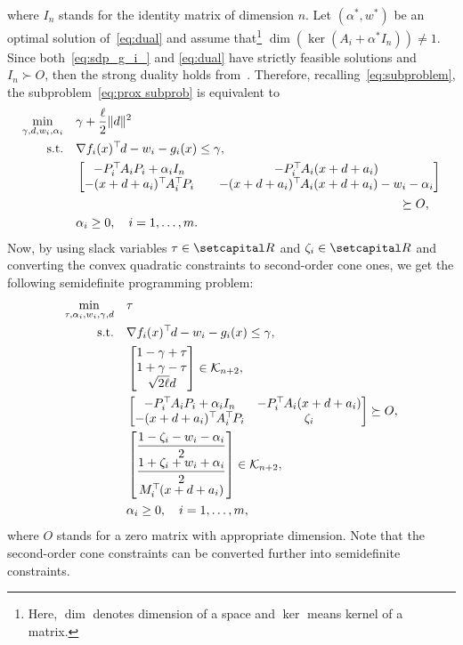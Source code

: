 \documentclass[../../main]{subfiles}
\begin{document}
where $I_n$ stands for the identity matrix of dimension $n$. Let $(\alpha^\ast, w^\ast)$ be an optimal solution of~\cref{eq:dual} and assume that\footnote{Here, $\dim$ denotes dimension of a space and $\ker$ means kernel of a matrix.} $\dim(\ker(A_i + \alpha^\ast I_n)) \neq 1$. Since both~\cref{eq:sdp_g_i_} and \cref{eq:dual} have strictly feasible solutions and $I_n \succ O$, then the strong duality holds from~\cite[Theorem~3.5]{Beck2006}. Therefore, recalling~\cref{eq:subproblem}, the subproblem~\cref{eq:prox subprob} is equivalent to
\begin{align}
\begin{aligned}
\min_{\gamma, d, w_i, \alpha_i} \quad & \gamma + \frac\ell2 \| d \|^2 \\ 
\st    \quad   & \nabla f_i (x)^\T d - w_i - g_i (x) \leq \gamma, \\
& \begin{bmatrix}
-P_i^\T A_i P_i + \alpha_i I_n &\quad -P_i^\T A_i (x + d + a_i) \\
-(x + d + a_i)^\T A_i^\T P_i &\quad -(x + d + a_i)^\T A_i (x + d + a_i) - w_i -\alpha_i
\end{bmatrix} \\
& \hspace{26em} \succeq O, \\
& \alpha_i \geq 0, \quad i = 1,\dots,m.
\end{aligned}
\end{align}
Now, by using slack variables $\tau \in \setR$ and $\zeta_i \in \setR$ and converting the convex quadratic constraints to second-order cone ones, we get the following semidefinite programming problem:
\begin{align} \label{eq:sdp}
\begin{aligned}
\min_{\tau, \alpha_i, w_i, \gamma, d} \quad   &\tau \\ 
\mathrm{s.t.}    \quad   &\nabla f_i(x)^\top\hspace{-1pt} d - w_i - g_i(x) \leq \gamma, \\
& \begin{bmatrix} 1 - \gamma + \tau \\
1 + \gamma - \tau \\
\sqrt{2 \ell} d
\end{bmatrix} \in \mathcal{K}_{n + 2}, \\
& 
\begin{bmatrix}
-P_i^\top\hspace{-1pt} A_i P_i + \alpha_i I_n & -P_i^\top\hspace{-1pt} A_i (x + d + a_i) \\
-(x + d + a_i)^\top\hspace{-1pt} A_i^\top\hspace{-1pt} P_i & \zeta_i
\end{bmatrix} \succeq
O, \\
& \begin{bmatrix} \dfrac{1 - \zeta_i - w_i - \alpha_i}{2} \\
\dfrac{1 + \zeta_i + w_i + \alpha_i}{2} \\
M_i^\top\hspace{-1pt} (x + d + a_i)
\end{bmatrix} \in \mathcal{K}_{n + 2}, \\
& \alpha_i \geq 0,  \quad i = 1,\ldots,m,
\end{aligned}
\end{align}
where $O$ stands for a zero matrix with appropriate dimension. Note that the second-order cone constraints can be converted further into semidefinite constraints.
\end{document}
